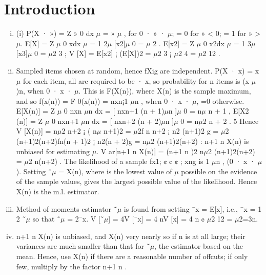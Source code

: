 \documentclass{article}
\begin{document}
\section{Introduction}
\begin{enumerate}[(i)]
\item (i) P(X · ») =
Z »
0
dx
$\mu$
= »
$\mu$
, for 0 · » · $\mu$; = 0 for » < 0; = 1 for » > $\mu$.
E[X] =
Z $\mu$
0
xdx
$\mu$
=
1
2$\mu$
[x2]$\mu$
0 = $\mu$
2
.
E[x2] =
Z $\mu$
0
x2dx
$\mu$
=
1
3$\mu$
[x3]$\mu$
0 = $\mu$2
3
; V [X] = E[x2] ¡ (E[X])2 = $\mu$2
3 ¡ $\mu$2
4 = $\mu$2
12 .
\item Sampled items chosen at random, hence fXig are independent. P(X · x) =
x
$\mu$ for each item, all are required to be · x, so probability for n items is (x
$\mu$ )n,
when 0 · x · $\mu$. This is F(X(n)), where X(n) is the sample maximum, and
so f(x(n)) = F
0(x(n)) = nxn¡1
$\mu$n , when 0 · x · $\mu$, =0 otherwise.
E[X(n)] =
Z $\mu$
0
nxn
$\mu$n dx = [ nxn+1
(n + 1)$\mu$n ]$\mu$
0 = n$\mu$
n + 1
,
E[X2
(n)] =
Z $\mu$
0
nxn+1
$\mu$n dx = [ nxn+2
(n + 2)$\mu$n ]$\mu$
0 = n$\mu$2
n + 2
.
5
Hence
V [X(n)] = n$\mu$2
n+2 ¡ ( n$\mu$
n+1)2 = $\mu$2f n
n+2 ¡ n2
(n+1)2 g
= $\mu$2
(n+1)2(n+2)fn(n + 1)2 ¡ n2(n + 2)g = n$\mu$2
(n+1)2(n+2) :
n+1
n X(n) is unbiased for estimating $\mu$.
V ar[n+1
n X(n)] = (n+1
n )2 n$\mu$2
(n+1)2(n+2) = $\mu$2
n(n+2) .
The likelihood of a sample fx1; ¢ ¢ ¢ ; xng is 1
$\mu$n , (0 · x · $\mu$).
Setting ˆ$\mu$ = X(n), where is the lowest value of $\mu$ possible on the evidence of
the sample values, gives the largest possible value of the likelihood. Hence
X(n) is the m.l. estimator.
\item Method of moments estimator ˜$\mu$ is found from setting ¯x = E[x], i.e., ¯x = 1
2
˜$\mu$
so that ˜$\mu$ = 2¯x. V [˜$\mu$] = 4V [¯x] = 4
nV [x] = 4
n ¢ $\mu$2
12 = $\mu$2=3n.
\item n+1
n X(n) is unbiased, and X(n) very nearly so if n is at all large; their
variances are much smaller than that for ˜$\mu$, the estimator based on the mean.
Hence, use X(n) if there are a reasonable number of offcuts; if only few,
multiply by the factor n+1
n .
\end{enumerate}
\end{document}
